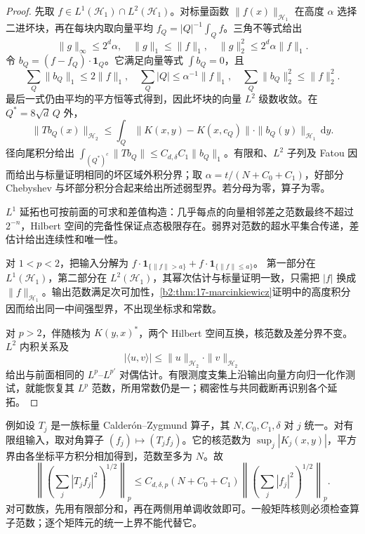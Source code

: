 \begin{proof}
先取 \(f\in L^1(\mathcal H_1)\cap L^2(\mathcal H_1)\)。对标量函数 \(\|f(x)\|_{\mathcal H_1}\) 在高度 \(\alpha\) 选择二进坏块，再在每块内取向量平均 \(f_Q=|Q|^{-1}\int_Qf\)。三角不等式给出
\[
 \|g\|_\infty\leq2^d\alpha,
 \quad\|g\|_1\leq\|f\|_1,
 \quad\|g\|_2^2\leq2^d\alpha\|f\|_1.
\]
令 \(b_Q=(f-f_Q)\cdot\mathbf1_Q\)。它满足向量等式 \(\int b_Q=0\)，且
\[
 \sum_Q\|b_Q\|_1\leq2\|f\|_1,
 \quad\sum_Q|Q|\leq\alpha^{-1}\|f\|_1,
 \quad\sum_Q\|b_Q\|_2^2\leq\|f\|_2^2.
\]
最后一式仍由平均的平方恒等式得到，因此坏块的向量 \(L^2\) 级数收敛。在 \(Q^*=8\sqrt d\,Q\) 外，
\[
 \|Tb_Q(x)\|_{\mathcal H_2}
 \leq\int_Q\|K(x,y)-K(x,c_Q)\|
                       \cdot\|b_Q(y)\|_{\mathcal H_1}\,\mathrm dy.
\]
径向尾积分给出 \(\int_{(Q^*)^c}\|Tb_Q\|\leq C_{d,\delta}C_1\|b_Q\|_1\)。有限和、\(L^2\) 子列及 Fatou 因而给出与标量证明相同的坏区域外积分界；取 \(\alpha=t/(N+C_0+C_1)\)，好部分 Chebyshev 与坏部分积分合起来给出所述弱型界。若分母为零，算子为零。

\(L^1\) 延拓也可按前面的可求和差值构造：几乎每点的向量相邻差之范数最终不超过 \(2^{-n}\)，Hilbert 空间的完备性保证点态极限存在。弱界对范数的超水平集合传递，差估计给出连续性和唯一性。

对 \(1<p<2\)，把输入分解为
\(f\cdot\mathbf1_{\{\|f\|>a\}}+f\cdot\mathbf1_{\{\|f\|\leq a\}}\)。
第一部分在 \(L^1(\mathcal H_1)\)，第二部分在 \(L^2(\mathcal H_1)\)，其幂次估计与标量证明一致，只需把 \(|f|\) 换成 \(\|f\|_{\mathcal H_1}\)。输出范数满足次可加性，\cref{b2:thm:17-marcinkiewicz}证明中的高度积分因而给出同一中间强型界，不出现坐标求和常数。

对 \(p>2\)，伴随核为 \(K(y,x)^*\)，两个 Hilbert 空间互换，核范数及差分界不变。\(L^2\) 内积关系及
\[
 |\langle u,v\rangle|\leq\|u\|_{\mathcal H_2}\cdot\|v\|_{\mathcal H_2}
\]
给出与前面相同的 \(L^p\)--\(L^{p'}\) 对偶估计。有限测度支集上沿输出向量方向归一化作测试，就能恢复其 \(L^p\) 范数，所用常数仍是一；稠密性与共同截断再识别各个延拓。
\end{proof}

例如设 \(T_j\) 是一族标量 Calderón--Zygmund 算子，其 \(N,C_0,C_1,\delta\) 对 \(j\) 统一。对有限组输入，取对角算子 \((f_j)\mapsto(T_jf_j)\)。它的核范数为 \(\sup_j|K_j(x,y)|\)，平方界由各坐标平方积分相加得到，范数至多为 \(N\)。故
\[
 \left\|\left(\sum_j|T_jf_j|^2\right)^{1/2}\right\|_p
 \leq C_{d,\delta,p}(N+C_0+C_1)
       \left\|\left(\sum_j|f_j|^2\right)^{1/2}\right\|_p.
\]
对可数族，先用有限部分和，再在两侧用单调收敛即可。一般矩阵核则必须检查算子范数；逐个矩阵元的统一上界不能代替它。

